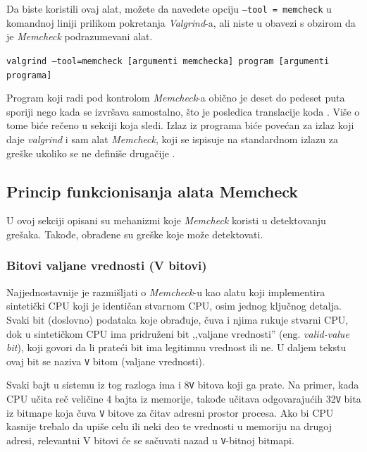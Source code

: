 \documentclass[12pt,oneside]{memoir}
\theoremstyle{plain}
\theoremstyle{definition}
\begin{document}

Da biste koristili ovaj alat, možete da navedete opciju \texttt{--tool = memcheck} u komandnoj liniji prilikom pokretanja \textit{Valgrind}-a, ali niste u obavezi s obzirom da je \textit{Memcheck} podrazumevani alat.
 \begin{center}
\texttt{valgrind –tool=memcheck [argumenti memchecka] program [argumenti programa]}
\end{center}

Program koji radi pod kontrolom \textit{Memcheck}-a obično je deset do pedeset puta sporiji nego kada se izvršava samostalno, što je posledica translacije koda \cite{ValgrindCore}. Više o tome biće rečeno u sekciji koja sledi. Izlaz iz programa biće povećan za izlaz koji daje \textit{valgrind} i sam alat \textit{Memcheck}, koji se ispisuje na standardnom izlazu za greške ukoliko se ne definiše drugačije \cite{ValgrindDOC}. 

\subsection{Princip funkcionisanja alata Memcheck}

U ovoj sekciji opisani su mehanizmi koje \textit{Memcheck} koristi u detektovanju grešaka. Takođe, obrađene su greške koje može detektovati.

\subsubsection{Bitovi valjane vrednosti (V bitovi)}
Najjednostavnije je razmišljati o \textit{Memcheck}-u kao alatu koji implementira sintetički CPU koji je identičan stvarnom CPU, osim jednog ključnog detalja. Svaki bit (doslovno) podataka koje obrađuje, čuva i njima rukuje stvarni CPU, dok u sintetičkom CPU ima pridruženi bit ,,valjane vrednosti'' (eng. \textit{valid-value bit}), koji govori da li prateći bit ima legitimnu vrednost ili ne. U daljem tekstu ovaj bit se naziva \texttt{V} bitom (valjane vrednosti).

Svaki bajt u sistemu iz tog razloga ima i 8\texttt{V} bitova koji ga prate. Na primer, kada CPU učita reč veličine 4 bajta iz memorije, takođe učitava odgovarajućih 32\texttt{V} bita iz bitmape koja čuva \texttt{V} bitove za čitav adresni prostor procesa. Ako bi CPU kasnije trebalo da upiše celu ili neki deo te vrednosti u memoriju na drugoj adresi, relevantni V bitovi će se sačuvati nazad u \texttt{V}-bitnoj bitmapi.
\end{document}
